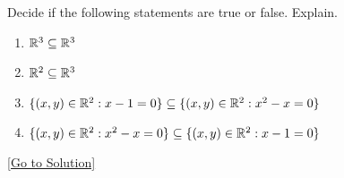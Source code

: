 \begin{exercise}\label{ex:3.3}
    Decide if the following statements are true or false. Explain. 
    \begin{enumerate}
        \item $\mathbb{R}^3\subseteq\mathbb{R}^3$
        \item $\mathbb{R}^2\subseteq\mathbb{R}^3$
        \item $\{ (x,y)\in\mathbb{R}^2:x-1=0 \}\subseteq \{ (x,y)\in\mathbb{R}^2:x^2-x=0 \}$
        \item $\{ (x,y)\in\mathbb{R}^2:x^2-x=0 \}\subseteq \{ (x,y)\in\mathbb{R}^2:x-1=0 \}$
    \end{enumerate}
\end{exercise}\hyperref[sol:3.3]{[Go to Solution]}
